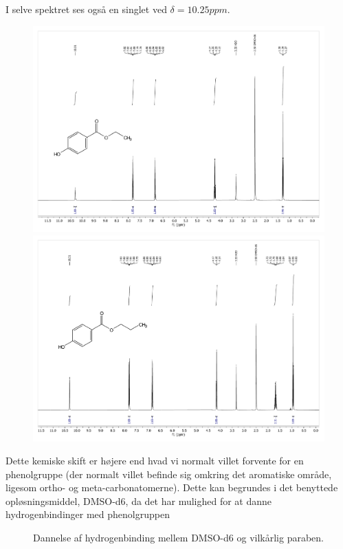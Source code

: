     I selve spektret ses også en singlet ved $\delta=10.25\si{ppm}$. 
    \begin{figure}[H]\centering
        \includegraphics[width=.48\textwidth,page=1]{bilag/ethylnmr}
        \includegraphics[width=.48\textwidth,page=1]{bilag/propylnmr}
    \end{figure}
    Dette kemiske skift er højere end hvad vi normalt villet forvente for en phenolgruppe (der normalt villet befinde sig omkring det aromatiske område, ligesom ortho- og meta-carbonatomerne). Dette kan begrundes i det benyttede opløsningsmiddel, DMSO-d6, da det har mulighed for at danne hydrogenbindinger med phenolgruppen \parencite{Raym2007}
    \begin{figure}[H]\centering
        \caption{Dannelse af hydrogenbinding mellem DMSO-d6 og vilkårlig paraben.}
    \end{figure}

